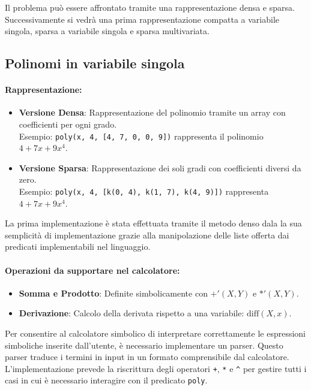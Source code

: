 \documentclass[12pt,twoside]{report}
\begin{document}
Il problema può essere affrontato tramite una rappresentazione densa e sparsa. Successivamente si vedrà una prima rappresentazione compatta a variabile singola, sparsa a variabile singola e sparsa multivariata.

\subsection*{Polinomi in variabile singola}
\paragraph{Rappresentazione:}
\begin{itemize}
    \item \textbf{Versione Densa}: Rappresentazione del polinomio tramite un array con coefficienti per ogni grado.\\
    Esempio: \texttt{poly(x, 4, [4, 7, 0, 0, 9])} rappresenta il polinomio $4 + 7x + 9x^4$.
    \item \textbf{Versione Sparsa}: Rappresentazione dei soli gradi con coefficienti diversi da zero.\\
    Esempio: \texttt{poly(x, 4, [k(0, 4), k(1, 7), k(4, 9)])} rappresenta $4 + 7x + 9x^4$.
\end{itemize}

La prima implementazione è stata effettuata tramite il metodo denso dala la sua semplicità di implementazione grazie alla manipolazione delle liste offerta dai predicati implementabili nel linguaggio.

\paragraph{Operazioni da supportare nel calcolatore:}
\begin{itemize}
    \item \textbf{Somma e Prodotto}: Definite simbolicamente con $+'(X, Y)$ e $*'(X, Y)$.
    \item \textbf{Derivazione}: Calcolo della derivata rispetto a una variabile: $\text{diff}(X, x)$.
\end{itemize}

Per consentire al calcolatore simbolico di interpretare correttamente le espressioni simboliche inserite dall'utente, è necessario implementare un parser. Questo parser traduce i termini in input in un formato comprensibile dal calcolatore. L'implementazione prevede la riscrittura degli operatori \texttt{+}, \texttt{*} e \texttt{\textasciicircum} per gestire tutti i casi in cui è necessario interagire con il predicato \texttt{poly}.
\end{document}
